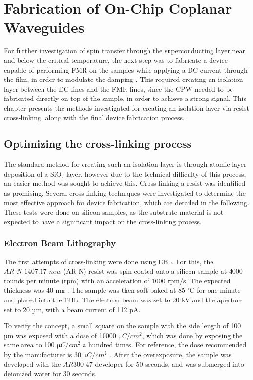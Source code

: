 \chapter{Fabrication of On-Chip Coplanar Waveguides}
\label{ch:Microfabrication}
For further investigation of spin transfer through the superconducting layer near and below the critical temperature, the next step was to fabricate a device capable of performing FMR on the samples while applying a DC current through the film, in order to modulate the damping \cite{Chen2024}. This required creating an isolation layer between the DC lines and the FMR lines, since the CPW needed to be fabricated directly on top of the sample, in order to achieve a strong signal. This chapter presents the methods investigated for creating an isolation layer via resist cross-linking, along with the final device fabrication process.

\section{Optimizing the cross-linking process}
The standard method for creating such an isolation layer is through atomic layer deposition of a $\textrm{SiO}_2$ layer, however due to the technical difficulty of this process, an easier method was sought to achieve this. Cross-linking a resist was identified as promising. Several cross-linking techniques were investigated to determine the most effective approach for device fabrication, which are detailed in the following. These tests were done on silicon samples, as the substrate material is not expected to have a significant impact on the cross-linking process.
\subsection{Electron Beam Lithography}
The first attempts of cross-linking were done using EBL. For this, the $\textit{AR-N 1407.17 new}$ (AR-N) resist was spin-coated onto a silicon sample at 4000 rounds per minute (rpm) with an acceleration of 1000 rpm/s. The expected thickness was 40 nm \cite{Allresist_ARN7520}. The sample was then soft-baked at 85 $^\circ$C for one minute and placed into the EBL. The electron beam was set to 20 kV and the aperture set to 20 µm, with a beam current of 112 pA.

To verify the concept, a small square on the sample with the side length of 100 µm was exposed with a dose of 10000 $\si{\micro C/cm^2}$, which was done by exposing the same area to 100 $\si{\micro C/cm^2}$ a hundred times. For reference, the dose recommended by the manufacturer is 30 $\si{\micro C/cm^2}$ \cite{Allresist_ARN7520}. After the overexposure, the sample was developed with the $\textit{AR300-47}$ developer for 50 seconds, and was submerged into deionized water for 30 seconds.

